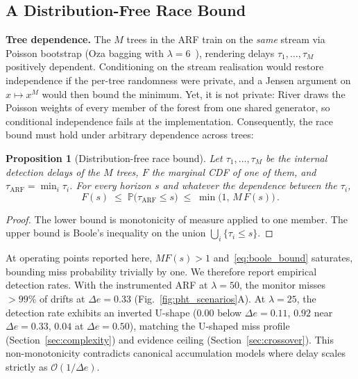 \documentclass[10pt,conference]{IEEEtran}
\newtheorem{proposition}{Proposition}
\theoremstyle{definition}
\begin{document}
\subsection{A Distribution-Free Race Bound}\label{sec:starvation_boundary}

\noindent\textbf{Tree dependence.}
The $M$ trees in the ARF train on the \emph{same} stream via Poisson bootstrap (Oza bagging with $\lambda = 6$~\cite{gomes_arf_2017}), rendering delays $\tau_1, \ldots, \tau_M$ positively dependent. Conditioning on the stream realisation would restore independence if the per-tree randomness were private, and a Jensen argument on $x \mapsto x^M$ would then bound the minimum. Yet, it is not private: River draws the Poisson weights of every member of the forest from one shared generator, so conditional independence fails at the implementation. Consequently, the race bound must hold under arbitrary dependence across trees:

\begin{proposition}[Distribution-free race bound]\label{prop:starvation_boundary}
  Let $\tau_1, \ldots, \tau_M$ be the internal detection delays of the $M$ trees, $F$ the marginal CDF of one of them, and $\tau_{\mathrm{ARF}} = \min_i \tau_i$. For every horizon $s$ and whatever the dependence between the $\tau_i$,
  \begin{equation}\label{eq:boole_bound}
    F(s) \;\le\; \mathbb{P}\bigl(\tau_{\mathrm{ARF}} \le s\bigr) \;\le\; \min\bigl(1,\, M\,F(s)\bigr)\,.
  \end{equation}
\end{proposition}

\begin{proof}
  The lower bound is monotonicity of measure applied to one member. The upper bound is Boole's inequality on the union $\bigcup_i \{\tau_i \le s\}$.
\end{proof}

At operating points reported here, $M F(s) > 1$ and~\eqref{eq:boole_bound} saturates, bounding miss probability trivially by one. We therefore report empirical detection rates. With the instrumented ARF at $\lambda = 50$, the monitor misses $>99\%$ of drifts at $\Delta e = 0.33$ (Fig.~\ref{fig:pht_scenarios}A). At $\lambda = 25$, the detection rate exhibits an inverted U-shape ($0.00$ below $\Delta e = 0.11$, $0.92$ near $\Delta e = 0.33$, $0.04$ at $\Delta e = 0.50$), matching the U-shaped miss profile (Section~\ref{sec:complexity}) and evidence ceiling (Section~\ref{sec:crossover}). This non-monotonicity contradicts canonical accumulation models where delay scales strictly as $\mathcal{O}(1/\Delta e)$.
\end{document}

